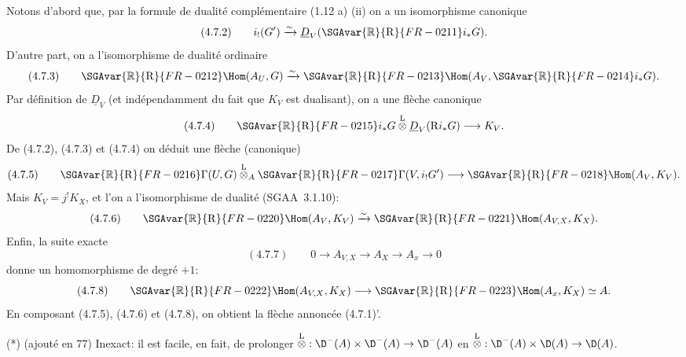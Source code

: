 Notons d'abord que, par la formule de dualité complémentaire (1.12 a) (ii) on a un isomorphisme canonique
\[
(4.7.2)\qquad i_!(G')\xrightarrow{\sim}\underline{D}_V(\SGAvar{\mathbb{R}}{\mathrm{R}}{FR-0211} i_*G).
\]
D'autre part, on a l'isomorphisme de dualité ordinaire
\[
(4.7.3)\qquad \SGAvar{\mathbb{R}}{\mathrm{R}}{FR-0212}\Hom(A_U,G)\xrightarrow{\sim}\SGAvar{\mathbb{R}}{\mathrm{R}}{FR-0213}\Hom(A_V,\SGAvar{\mathbb{R}}{\mathrm{R}}{FR-0214} i_*G).
\]
Par définition de $\underline{D}_V$ (et indépendamment du fait que $K_V$ est dualisant), on a une flèche canonique
\[
(4.7.4)\qquad \SGAvar{\mathbb{R}}{\mathrm{R}}{FR-0215} i_*G\overset{\mathrm{L}}{\otimes}\underline{D}_V(\mathrm{R} i_*G)\longrightarrow K_V.
\]
De (4.7.2), (4.7.3) et (4.7.4) on déduit une flèche (canonique)
\[
(4.7.5)\qquad \SGAvar{\mathbb{R}}{\mathrm{R}}{FR-0216}\Gamma(U,G)\overset{\mathrm{L}}{\otimes}_A\SGAvar{\mathbb{R}}{\mathrm{R}}{FR-0217}\Gamma(V,i_!G')\longrightarrow \SGAvar{\mathbb{R}}{\mathrm{R}}{FR-0218}\Hom(A_V,K_V).
\]
Mais $K_V=j^{!}K_X$, et l'on a l'isomorphisme de dualité (SGAA~3.1.10):
\[
(4.7.6)\qquad \SGAvar{\mathbb{R}}{\mathrm{R}}{FR-0220}\Hom(A_V,K_V)\xrightarrow{\sim}\SGAvar{\mathbb{R}}{\mathrm{R}}{FR-0221}\Hom(A_{V,X},K_X).
\]
Enfin, la suite exacte
\[
(4.7.7)\qquad 0\longrightarrow A_{V,X}\longrightarrow A_X\longrightarrow A_x\longrightarrow 0
\]
donne un homomorphisme de degré $+1$:
\[
(4.7.8)\qquad \SGAvar{\mathbb{R}}{\mathrm{R}}{FR-0222}\Hom(A_{V,X},K_X)\longrightarrow \SGAvar{\mathbb{R}}{\mathrm{R}}{FR-0223}\Hom(A_x,K_X)\simeq A.
\]
En composant (4.7.5), (4.7.6) et (4.7.8), on obtient la flèche annoncée (4.7.1)'.

(*) (ajouté en 77) Inexact: il est facile, en fait, de prolonger $\overset{\mathrm{L}}{\otimes}:\D^-(A)\times\D^-(A)\to\D^-(A)$ en $\overset{\mathrm{L}}{\otimes}:\D^-(A)\times\D(A)\to\D(A)$.

